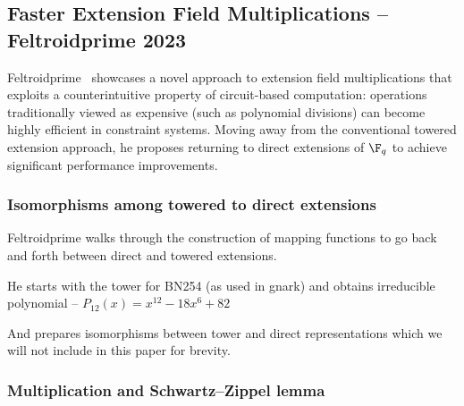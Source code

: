 
\subsection{Faster Extension Field Multiplications -- Feltroidprime 2023}

Feltroidprime~\cite{FXFM23} showcases a novel approach to extension field multiplications that exploits a counterintuitive property of circuit-based computation: operations traditionally viewed as expensive (such as polynomial divisions) can become highly efficient in constraint systems. Moving away from the conventional towered extension approach, he proposes returning to direct extensions of $\F_{q}$ to achieve significant performance improvements.

\subsubsection{Isomorphisms among towered to direct extensions}

Feltroidprime walks through the construction of mapping functions to go back and forth between direct and towered extensions.





He starts with the tower for BN254 (as used in gnark\cite{gnark}) and obtains irreducible polynomial -- $P_{12}(x) = x^{12} - 18x^6 + 82$

And prepares isomorphisms between tower and direct representations\cite{FELT23ISO} which we will not include in this paper for brevity.

\subsubsection{Multiplication and Schwartz--Zippel lemma}

